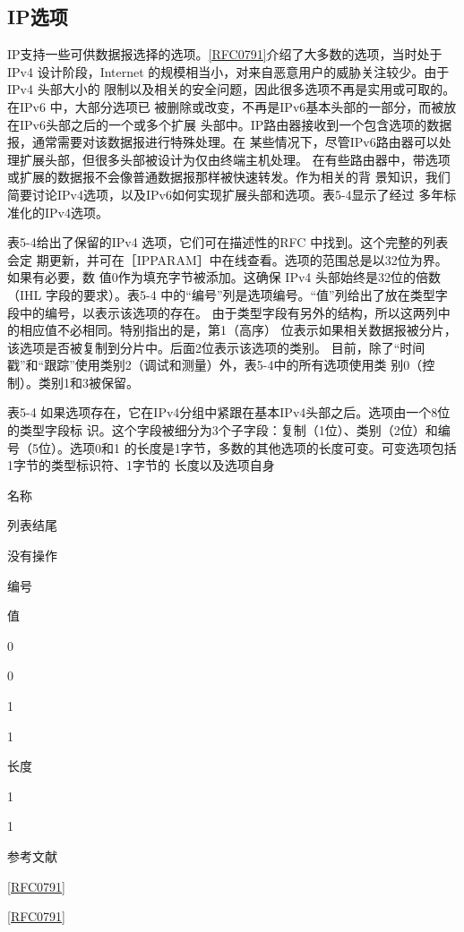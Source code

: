 \subsection{IP选项}

IP支持一些可供数据报选择的选项。\href{https://www.rfc-editor.org/rfc/rfc0791}{[RFC0791]}介绍了大多数的选项，当时处于IPv4
设计阶段，Internet 的规模相当小，对来自恶意用户的威胁关注较少。由于 IPv4 头部大小的
限制以及相关的安全问题，因此很多选项不再是实用或可取的。在IPv6 中，大部分选项已
被删除或改变，不再是IPv6基本头部的一部分，而被放在IPv6头部之后的一个或多个扩展
头部中。IP路由器接收到一个包含选项的数据报，通常需要对该数据报进行特殊处理。在
某些情况下，尽管IPv6路由器可以处理扩展头部，但很多头部被设计为仅由终端主机处理。
在有些路由器中，带选项或扩展的数据报不会像普通数据报那样被快速转发。作为相关的背
景知识，我们简要讨论IPv4选项，以及IPv6如何实现扩展头部和选项。表5-4显示了经过
多年标准化的IPv4选项。

表5-4给出了保留的IPv4 选项，它们可在描述性的RFC 中找到。这个完整的列表会定
期更新，并可在［IPPARAM］中在线查看。选项的范围总是以32位为界。如果有必要，数
值0作为填充字节被添加。这确保 IPv4 头部始终是32位的倍数（IHL 字段的要求）。表5-4
中的“编号”列是选项编号。“值”列给出了放在类型字段中的编号，以表示该选项的存在。
由于类型字段有另外的结构，所以这两列中的相应值不必相同。特别指出的是，第1（高序）
位表示如果相关数据报被分片，该选项是否被复制到分片中。后面2位表示该选项的类别。
目前，除了“时间戳”和“跟踪”使用类别2（调试和测量）外，表5-4中的所有选项使用类
别0（控制）。类别1和3被保留。

表5-4 如果选项存在，它在IPv4分组中紧跟在基本IPv4头部之后。选项由一个8位的类型字段标
识。这个字段被细分为3个子字段：复制（1位）、类别（2位）和编号（5位）。选项0和1
的长度是1字节，多数的其他选项的长度可变。可变选项包括1字节的类型标识符、1字节的
长度以及选项自身

名称

列表结尾

没有操作

编号

值

0

0

1

1

长度

1

1

参考文献

\href{https://www.rfc-editor.org/rfc/rfc0791}{[RFC0791]}

\href{https://www.rfc-editor.org/rfc/rfc0791}{[RFC0791]}

